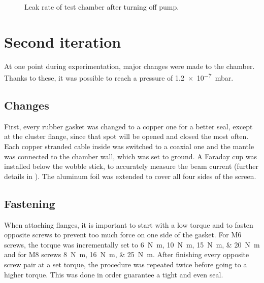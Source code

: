 \begin{figure}[ht]
	\centering
		
	\begin{tikzpicture}
		
	\end{tikzpicture}
	
	\caption{Leak rate of test chamber after turning off pump.}
	\label{fig:Leak rate of test chamber after turning off pump}
\end{figure}


\section{Second iteration}
\label{sec:Second iteration}

At one point during experimentation, major changes were made to the chamber. Thanks to these, it was possible to reach a pressure of \SI{1.2e-7}{\milli\bar}.

\subsection{Changes}
\label{subsec:Changes}

First, every rubber gasket was changed to a copper one for a better seal, except at the cluster flange, since that spot will be opened and closed the most often. Each copper stranded cable inside was switched to a coaxial one and the mantle was connected to the chamber wall, which was set to ground. A Faraday cup was installed below the wobble stick, to accurately measure the beam current (further details in ). The aluminum foil was extended to cover all four sides of the screen.

\subsection{Fastening}
\label{subsec:Fastening}

When attaching flanges, it is important to start with a low torque and to fasten opposite screws to prevent too much force on one side of the gasket. For M6 screws, the torque was incrementally set to \SIlist{6;10;15;20}{\newton\meter} and for M8 screws \SIlist{8;16;25}{\newton\meter}. After finishing every opposite screw pair at a set torque, the procedure was repeated twice before going to a higher torque. This was done in order guarantee a tight and even seal.